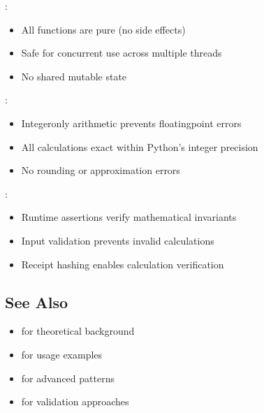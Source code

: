 \documentclass[letterpaper,10pt,english]{sphinxmanual}
\begin{document}
\sphinxAtStartPar
{}:
\begin{itemize}
\item {} 
\sphinxAtStartPar
All functions are pure (no side effects)

\item {} 
\sphinxAtStartPar
Safe for concurrent use across multiple threads

\item {} 
\sphinxAtStartPar
No shared mutable state

\end{itemize}

\sphinxAtStartPar
{}:
\begin{itemize}
\item {} 
\sphinxAtStartPar
Integer\sphinxhyphen{}only arithmetic prevents floating\sphinxhyphen{}point errors

\item {} 
\sphinxAtStartPar
All calculations exact within Python’s integer precision

\item {} 
\sphinxAtStartPar
No rounding or approximation errors

\end{itemize}

\sphinxAtStartPar
{}:
\begin{itemize}
\item {} 
\sphinxAtStartPar
Runtime assertions verify mathematical invariants

\item {} 
\sphinxAtStartPar
Input validation prevents invalid calculations

\item {} 
\sphinxAtStartPar
Receipt hashing enables calculation verification

\end{itemize}


\subsection{See Also}
\label{\detokenize{api_reference:see-also}}\begin{itemize}
\item {} 
\sphinxAtStartPar
{\hyperref[\detokenize{mathematical_foundation::doc}]{}} for theoretical background

\item {} 
\sphinxAtStartPar
{\hyperref[\detokenize{quickstart::doc}]{}} for usage examples

\item {} 
\sphinxAtStartPar
{\hyperref[\detokenize{examples::doc}]{}} for advanced patterns

\item {} 
\sphinxAtStartPar
{\hyperref[\detokenize{testing::doc}]{}} for validation approaches

\end{itemize}
\end{document}
